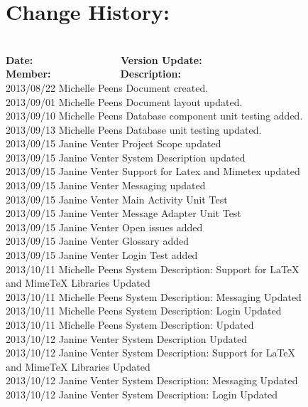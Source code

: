 \documentclass[29pt,a4paper]{moderncv}
\begin{document}
\section{\textbf{Change History:}}
\begin{tabbing}
\\\textbf{Date:} ~~~~~~~~~~~~~~~~~\= \textbf{Version Update:}~~~~~~~ \= \textbf{Member:}~~~~~~~~~~~~~~\= \textbf{Description:}\\
2013/08/22  \> Michelle Peens \> Document created.\\
2013/09/01  \> Michelle Peens \> Document layout updated.\\
2013/09/10  \> Michelle Peens \> Database component unit testing added.\\
2013/09/13  \> Michelle Peens \> Database unit testing updated.\\
2013/09/15  \> Janine Venter \> Project Scope updated\\
2013/09/15  \> Janine Venter\> System Description updated\\
2013/09/15  \> Janine Venter \>Support for Latex and Mimetex updated\\
2013/09/15  \> Janine Venter \> Messaging updated\\
2013/09/15  \> Janine Venter \> Main Activity Unit Test\\
2013/09/15  \> Janine Venter \> Message Adapter Unit Test\\
2013/09/15  \> Janine Venter \> Open issues added\\
2013/09/15  \> Janine Venter \> Glossary added\\
2013/09/15  \> Janine Venter \> Login Test added\\
2013/10/11  \> Michelle Peens \> System Description: Support for LaTeX \\ \> \> \> and MimeTeX Libraries Updated\\
2013/10/11  \> Michelle Peens \> System Description: Messaging Updated\\
2013/10/11  \> Michelle Peens \> System Description: Login Updated\\
2013/10/11  \> Michelle Peens \> System Description: Updated\\
2013/10/12  \> Janine Venter \> System Description Updated\\
2013/10/12  \> Janine Venter \> System Description: Support for LaTeX \\ \> \> \> and MimeTeX Libraries Updated\\
2013/10/12  \> Janine Venter \> System Description: Messaging Updated\\
2013/10/12  \> Janine Venter \> System Description: Login Updated\\


\end{tabbing}
\end{document}
